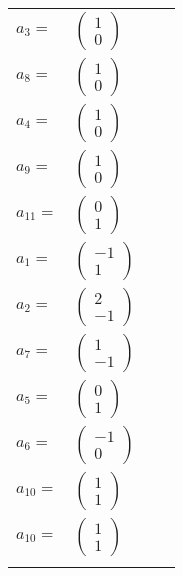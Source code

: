 \documentclass[1p]{elsarticle_modified}
\theoremstyle{definition}
\begin{document}
\begin{tabular}{m{7pt} m{180pt} m{7pt} m{180pt} }
\flushright $a_{3}=$&$\begin{pmatrix}1\\0\end{pmatrix}$ \\
\flushright $a_{8}=$&$\begin{pmatrix}1\\0\end{pmatrix}$ \\
\flushright $a_{4}=$&$\begin{pmatrix}1\\0\end{pmatrix}$ \\
\flushright $a_{9}=$&$\begin{pmatrix}1\\0\end{pmatrix}$ \\
\flushright $a_{11}=$&$\begin{pmatrix}0\\1\end{pmatrix}$ \\
\flushright $a_{1}=$&$\begin{pmatrix}-1\\1\end{pmatrix}$ \\
\flushright $a_{2}=$&$\begin{pmatrix}2\\-1\end{pmatrix}$ \\
\flushright $a_{7}=$&$\begin{pmatrix}1\\-1\end{pmatrix}$ \\
\flushright $a_{5}=$&$\begin{pmatrix}0\\1\end{pmatrix}$ \\
\flushright $a_{6}=$&$\begin{pmatrix}-1\\0\end{pmatrix}$ \\
\flushright $a_{10}=$&$\begin{pmatrix}1\\1\end{pmatrix}$\\ \flushright $a_{10}=$&$\begin{pmatrix}1\\1\end{pmatrix}$\\&\end{tabular}
\end{document}
